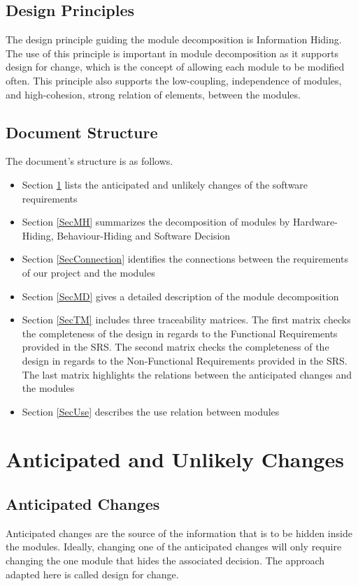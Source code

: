 \documentclass[12pt, titlepage]{article}
\begin{document}
\subsection{Design Principles}
The design principle guiding the module decomposition is Information Hiding. The use of this principle is important in module decomposition as it supports design for change, which is the concept of allowing each module to be modified often. This principle also supports the low-coupling, independence of modules, and high-cohesion, strong relation of elements, between the modules.
\subsection{Document Structure}
The document's structure is as follows. 
\begin{itemize}
    \item Section \ref{SecChange} lists the anticipated and unlikely changes of the software requirements 
    \item Section \ref{SecMH} summarizes the decomposition of modules by Hardware-Hiding, Behaviour-Hiding and Software Decision
    \item Section \ref{SecConnection} identifies the connections between the requirements of our project and the modules
    \item Section \ref{SecMD} gives a detailed description of the module decomposition
    \item Section \ref{SecTM} includes three traceability matrices. The first matrix checks the completeness of the design in regards to the Functional Requirements provided in the SRS. The second matrix checks the completeness of the design in regards to the Non-Functional Requirements provided in the SRS. The last matrix highlights the relations between the anticipated changes and the modules
    \item Section \ref{SecUse} describes the use relation between modules
\end{itemize}  

\section{Anticipated and Unlikely Changes} \label{SecChange}
\subsection{Anticipated Changes} \label{SecAchange}
Anticipated changes are the source of the information that is to be hidden
inside the modules. Ideally, changing one of the anticipated changes will only
require changing the one module that hides the associated decision. The approach
adapted here is called design for
change.
\end{document}
